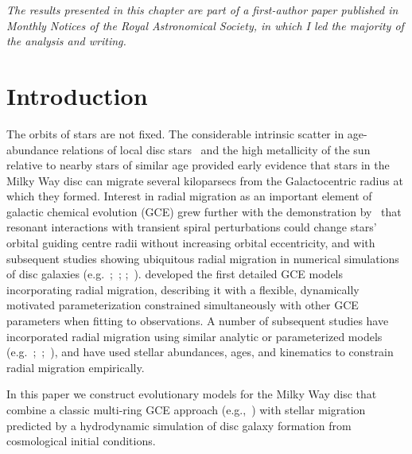 
\begin{center}
\textit{
	The results presented in this chapter are part of a first-author paper
	published in Monthly Notices of the Royal Astronomical Society, in which I
	led the majority of the analysis and writing.
}
\end{center}

\section{Introduction}
\label{migration:sec:intro}
The orbits of stars are not fixed. The considerable intrinsic scatter in 
age-abundance relations of local disc stars~\citep{Edvardsson1993} and the high 
metallicity of the sun relative to nearby stars of similar age 
\citep*{Wielen1996} provided early evidence that stars in the Milky Way disc 
can migrate several kiloparsecs from the Galactocentric radius at which they 
formed. 
Interest in radial migration as an important element of galactic chemical 
evolution (GCE) grew further with the demonstration by~\citet{Sellwood2002} 
that resonant interactions with transient spiral perturbations could 
change stars' orbital guiding centre radii without increasing orbital 
eccentricity, and with subsequent studies showing ubiquitous radial migration 
in numerical simulations of disc galaxies (e.g.~\citealp{Roskar2008a, 
Roskar2008b, Loebman2011, Minchev2011};~\citealp*{Bird2012}; 
\citealp{Bird2013};~\citealp*{Grand2012a, Grand2012b, Kubryk2013}). 
\citet{Schoenrich2009a,Schoenrich2009b} developed the first detailed GCE 
models incorporating radial migration, describing it with a flexible, 
dynamically motivated parameterization constrained simultaneously with other 
GCE parameters when fitting to observations. A number of subsequent studies 
have incorporated radial migration using similar analytic or parameterized 
models (e.g.~\citealp{Bilitewski2012, Hayden2015};~\citealp*{Kubryk2015a, 
Kubryk2015b};~\citealp{Feuillet2018, Sharma2021}), and 
\citet{Frankel2018, Frankel2019, Frankel2020} have used stellar abundances, 
ages, and kinematics to constrain radial migration empirically. 
\par 
In this paper we construct evolutionary models for the Milky Way disc that 
combine a classic multi-ring GCE approach (e.g.,~\citealp{Matteucci1989, 
Wyse1989, Prantzos1995}) with stellar migration predicted by a 
hydrodynamic simulation of disc galaxy formation from cosmological initial 
conditions. 
